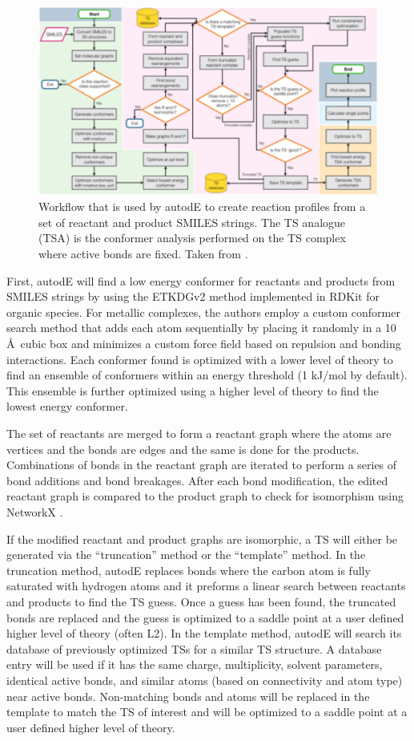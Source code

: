 \documentclass[preprint, 11pt]{elsarticle} %
\begin{document}
\begin{figure}[htbp]
    \centering
    \includegraphics{autode}
    \caption{Workflow that is used by autodE to create reaction profiles from a set of reactant and product SMILES strings. The TS analogue (TSA) is the conformer analysis performed on the TS complex where active bonds are fixed. Taken from \cite{young:2020}.}
    \label{fig:autode}
\end{figure}

First, autodE will find a low energy conformer for reactants and products from SMILES strings by using the ETKDGv2 method implemented in RDKit \cite{RDKit:2018} for organic species.
For metallic complexes, the authors employ a custom conformer search method that adds each atom sequentially by placing it randomly in a 10 \AA~cubic box and minimizes a custom force field based on repulsion and bonding interactions.
Each conformer found is optimized with a lower level of theory to find an ensemble of conformers within an energy threshold (1 kJ/mol by default).
This ensemble is further optimized using a higher level of theory to find the lowest energy conformer. 

The set of reactants are merged to form a reactant graph where the atoms are vertices and the bonds are edges and the same is done for the products. 
Combinations of bonds in the reactant graph are iterated to perform a series of bond additions and bond breakages.
After each bond modification, the edited reactant graph is compared to the product graph to check for isomorphism using NetworkX \cite{networkx:2008}.

If the modified reactant and product graphs are isomorphic, a TS will either be generated via the ``truncation'' method or the ``template'' method. 
In the truncation method, autodE replaces  bonds where the carbon atom is fully saturated with hydrogen atoms and it preforms a linear search between reactants and products to find the TS guess.
Once a guess has been found, the truncated bonds are replaced and the guess is optimized to a saddle point at a user defined higher level of theory (often L2).
In the template method, autodE will search its database of previously optimized TSs for a similar TS structure.
A database entry will be used if it has the same charge, multiplicity, solvent parameters, identical active bonds, and similar atoms (based on connectivity and atom type) near active bonds.
Non-matching bonds and atoms will be replaced in the template to match the TS of interest and will be optimized to a saddle point at a user defined higher level of theory.
\end{document}
